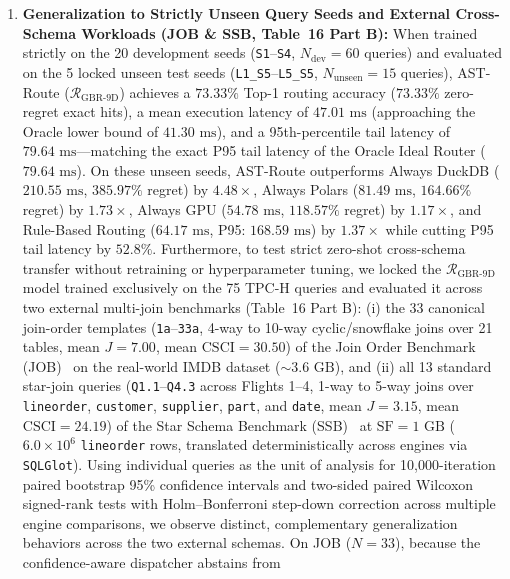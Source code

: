 \documentclass[10pt,a4paper]{article}
\begin{document}
\begin{enumerate}[leftmargin=1.5em,itemsep=2pt]
confidence-aware routing reduces the probability of selecting a slower engine ($P_{\text{subopt}} = 1 - \text{Zero-Regret Hit Rate}$) from $46.67\%$ ($35/75$) under point-estimate $\arg\min$ to $41.33\%$ ($31/75$), lowers expected latency regret from $48.12\%$ ($58.64\text{ ms}$) to $34.98\%$ ($54.92\text{ ms}$), cuts P95 tail regret from $164.80\%$ to $114.11\%$, reduces worst-case (maximum) regret from $312.40\%$ to $245.18\%$ (vs.\ $620.63\%$ on Always GPU), more than halves the high-regret failure rate ($\mathcal{R}_{\text{regret}} > 100\%$) from $14.67\%$ ($11/75$) to $6.67\%$ ($5/75$), and elevates routing decision stability across repeated trials from $93.33\%$ to $98.67\%$.
    \item \textbf{Generalization to Strictly Unseen Query Seeds and External Cross-Schema Workloads (JOB \& SSB, Table~16 Part B):} When trained strictly on the 20 development seeds (\texttt{S1}--\texttt{S4}, $N_{\text{dev}}=60$ queries) and evaluated on the 5 locked unseen test seeds (\texttt{L1\_\allowbreak{}S5}--\texttt{L5\_\allowbreak{}S5}, $N_{\text{unseen}}=15$ queries), AST-Route ($\mathcal{R}_{\text{GBR-9D}}$) achieves a $73.33\%$ Top-1 routing accuracy ($73.33\%$ zero-regret exact hits), a mean execution latency of $47.01\text{ ms}$ (approaching the Oracle lower bound of $41.30\text{ ms}$), and a 95th-percentile tail latency of $79.64\text{ ms}$---matching the exact P95 tail latency of the Oracle Ideal Router ($79.64\text{ ms}$). On these unseen seeds, AST-Route outperforms Always DuckDB ($210.55\text{ ms}$, $385.97\%$ regret) by $4.48\times$, Always Polars ($81.49\text{ ms}$, $164.66\%$ regret) by $1.73\times$, Always GPU ($54.78\text{ ms}$, $118.57\%$ regret) by $1.17\times$, and Rule-Based Routing ($64.17\text{ ms}$, P95: $168.59\text{ ms}$) by $1.37\times$ while cutting P95 tail latency by $52.8\%$. Furthermore, to test strict zero-shot cross-schema transfer without retraining or hyperparameter tuning, we locked the $\mathcal{R}_{\text{GBR-9D}}$ model trained exclusively on the 75 TPC-H queries and evaluated it across two external multi-join benchmarks (Table~16 Part B): (i) the 33 canonical join-order templates (\texttt{1a}--\texttt{33a}, 4-way to 10-way cyclic/snowflake joins over 21 tables, mean $J=7.00$, mean $\text{CSCI}=30.50$) of the Join Order Benchmark (JOB)~\cite{leis2015job} on the real-world IMDB dataset ($\sim 3.6\text{ GB}$), and (ii) all 13 standard star-join queries (\texttt{Q1.1}--\texttt{Q4.3} across Flights 1--4, 1-way to 5-way joins over \texttt{lineorder}, \texttt{customer}, \texttt{supplier}, \texttt{part}, and \texttt{date}, mean $J=3.15$, mean $\text{CSCI}=24.19$) of the Star Schema Benchmark (SSB)~\cite{oneil2009ssb} at $\text{SF}=1\text{ GB}$ ($6.0\times 10^6$ \texttt{lineorder} rows, translated deterministically across engines via \texttt{SQLGlot}). Using individual queries as the unit of analysis for 10,000-iteration paired bootstrap 95\% confidence intervals and two-sided paired Wilcoxon signed-rank tests with Holm--Bonferroni step-down correction across multiple engine comparisons, we observe distinct, complementary generalization behaviors across the two external schemas. On JOB ($N=33$), because the confidence-aware dispatcher abstains from 
\end{enumerate}
\end{document}
